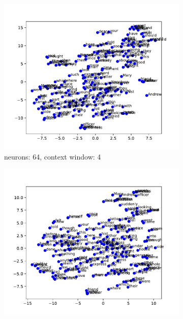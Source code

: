 \documentclass[12pt]{article} \usepackage{COSC420style} \usepackage{soul}
\begin{document}
\begin{figure}[htbp]
	\centering
	\begin{subfigure}[b]{0.45\textwidth}
		\includegraphics[width=\textwidth]{./figures/dim_64_ctx_4_embedding.pdf}
		\caption{neurons: 64, context window: 4}
		\label{fig:64_4}
	\end{subfigure}
	\hfill %
	\begin{subfigure}[b]{0.45\textwidth}
		\includegraphics[width=\textwidth]{./figures/dim_128_ctx_4_embedding.pdf}

\end{subfigure}
\end{figure}
\end{document}
